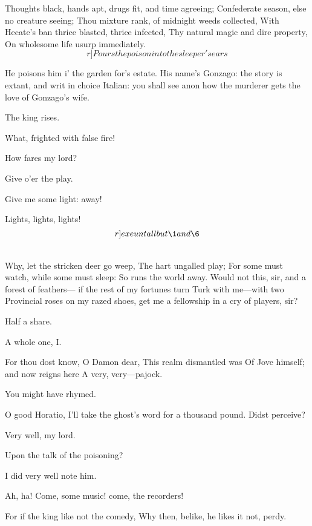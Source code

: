 \documentclass[11pt]{book}
\newenvironment {song}[1][0]
 {\Versus 
  \Locus \textus {+7em+#1em} 
  \Forma \strophae {01}
 }
 {\endVersus}
\begin{document}
\Versus

  Thoughts black, hands apt, drugs fit, and time agreeing;
	Confederate season, else no creature seeing;
	Thou mixture rank, of midnight weeds collected,
	With Hecate's ban thrice blasted, thrice infected,
	Thy natural magic and dire property,
	On wholesome life usurp immediately.
	\[r]Pours the poison into the sleeper's ears\]
\endVersus

\1	He poisons him i' the garden for's estate. His
	name's Gonzago: the story is extant, and writ in
	choice Italian: you shall see anon how the murderer
	gets the love of Gonzago's wife.

\4	The king rises.

\1	What, frighted with false fire!

\3	How fares my lord?

\5	Give o'er the play.

\2	Give me some light: away!

	Lights, lights, lights! 	\[r]exeunt all but \1 and \6\]
\begin{song}[-2.5]
\1	\\
   Why, let the stricken deer go weep,
	The hart ungalled play;
	For some must watch, while some must sleep:
	So runs the world away.
\end{song}
	Would not this, sir, and a forest of feathers--- if
	the rest of my fortunes turn Turk with me---with two
	Provincial roses on my razed shoes, get me a
	fellowship in a cry of players, sir?

\6	Half a share.

\1	A whole one, I.
\begin{song}[-2.5]
	For thou dost know, O Damon dear,
	This realm dismantled was
	Of Jove himself; and now reigns here
	A very, very---pajock.
\end{song}

\6	You might have rhymed.

\1	O good Horatio, I'll take the ghost's word for a
	thousand pound. Didst perceive?

\6	Very well, my lord.

\1	Upon the talk of the poisoning?

\6	I did very well note him.

\1	\DriveOut* Ah, ha! Come, some music! come, the re\-cord\-ers!

\begin{song}[-2.5]
	For if the king like not the comedy,
	Why then, belike, he likes it not, perdy.
\end{song}
\end{document}
